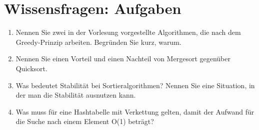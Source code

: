 \documentclass{scrartcl}
\begin{document}
\section*{Wissensfragen: Aufgaben}
\begin{enumerate}[(1)]

\item Nennen Sie zwei in der Vorlesung vorgestellte Algorithmen, die nach dem Greedy-Prinzip arbeiten. Begründen Sie kurz, warum.

\item Nennen Sie einen Vorteil und einen Nachteil von Mergesort gegenüber Quicksort.

\item Was bedeutet Stabilität bei Sortieralgorithmen? Nennen Sie eine Situation, in der man die Stabilität ausnutzen kann.

\item Was muss für eine Hashtabelle mit Verkettung gelten, damit der Aufwand für die Suche nach einem Element O(1) beträgt?
\end{enumerate}
\end{document}
